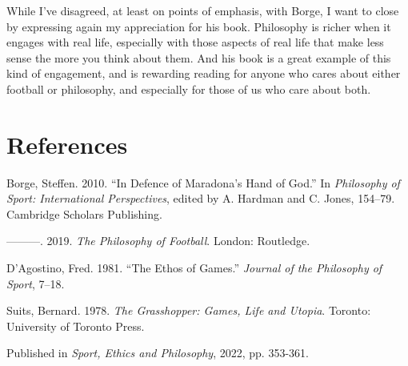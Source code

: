 \documentclass[
  10pt,
  letterpaper,
  DIV=11,
  numbers=noendperiod,
  twoside]{scrartcl}
\newlength{\cslhangindent}
\newenvironment{CSLReferences}[2] %
 {\begin{list}{}{%
  \setlength{\itemindent}{0pt}
  \setlength{\leftmargin}{0pt}
  \setlength{\parsep}{0pt}
  \ifodd #1
   \setlength{\leftmargin}{\cslhangindent}
   \setlength{\itemindent}{-1\cslhangindent}
  \fi
  \setlength{\itemsep}{#2\baselineskip}}}
 {\end{list}}
\begin{document}
While I've disagreed, at least on points of emphasis, with Borge, I want
to close by expressing again my appreciation for his book. Philosophy is
richer when it engages with real life, especially with those aspects of
real life that make less sense the more you think about them. And his
book is a great example of this kind of engagement, and is rewarding
reading for anyone who cares about either football or philosophy, and
especially for those of us who care about both.

\section*{References}\label{references}

\label{refs}
\begin{CSLReferences}{1}{0}
Borge, Steffen. 2010. {``In Defence of Maradona's Hand of God.''} In
\emph{Philosophy of Sport: International Perspectives}, edited by A.
Hardman and C. Jones, 154--79. Cambridge Scholars Publishing.

---------. 2019. \emph{The Philosophy of Football}. London: Routledge.

D'Agostino, Fred. 1981. {``The Ethos of Games.''} \emph{Journal of the
Philosophy of Sport}, 7--18.

Suits, Bernard. 1978. \emph{The Grasshopper: Games, Life and Utopia}.
Toronto: University of Toronto Press.

\end{CSLReferences}



\noindent Published in\emph{
Sport, Ethics and Philosophy}, 2022, pp. 353-361.
\end{document}
